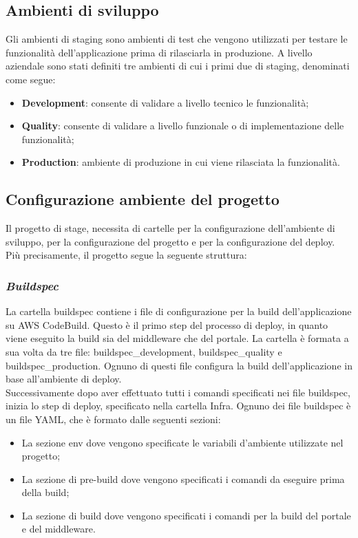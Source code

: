 \subsection{Ambienti di sviluppo}
Gli ambienti di staging sono ambienti di test che vengono utilizzati per testare le funzionalità dell'applicazione prima di rilasciarla in produzione.
A livello aziendale sono stati definiti tre ambienti di cui i primi due di staging, denominati come segue:
\begin{itemize}
  \item \textbf{Development}: consente di validare a livello tecnico le funzionalità;
  \item \textbf{Quality}: consente di validare a livello funzionale o di implementazione delle funzionalità;
  \item \textbf{Production}: ambiente di produzione in cui viene rilasciata la funzionalità.
\end{itemize}

\subsection{Configurazione ambiente del progetto}
Il progetto di stage, necessita di cartelle per la configurazione dell'ambiente di sviluppo, per la configurazione del progetto e per la configurazione del deploy.
Più precisamente, il progetto segue la seguente struttura:

\subsubsection*{\emph{Buildspec}}
La cartella buildspec contiene i file di configurazione per la build dell'applicazione su AWS CodeBuild.
Questo è il primo step del processo di deploy, in quanto viene eseguito la build sia del middleware che del portale.
La cartella è formata a sua volta da tre file: buildspec\_development, buildspec\_quality e buildspec\_production. 
Ognuno di questi file configura la build dell'applicazione in base all'ambiente di deploy.\\
Successivamente dopo aver effettuato tutti i comandi specificati nei file buildspec, inizia lo step di deploy, specificato nella cartella Infra.
Ognuno dei file buildspec è un file YAML, che è formato dalle seguenti sezioni:
\begin{itemize}
  \item La sezione env dove vengono specificate le variabili d'ambiente utilizzate nel progetto;
  \item La sezione di pre-build dove vengono specificati i comandi da eseguire prima della build;
  \item La sezione di build dove vengono specificati i comandi per la build del portale e del middleware.
\end{itemize}

